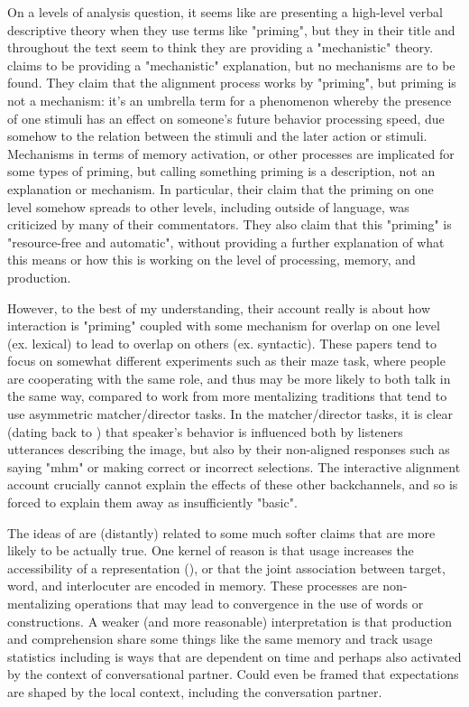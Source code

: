 \documentclass[]{article}
\begin{document}
On a levels of analysis question, it seems like \cite{pickering2004} are presenting a high-level verbal descriptive theory when they use terms like "priming", but they in their title and throughout the text seem to think they are providing a "mechanistic" theory. \cite{pickering2004} claims to be providing a "mechanistic" explanation, but no mechanisms are to be found. They claim that the alignment process works by "priming", but priming is not a mechanism: it's an umbrella term for a phenomenon whereby the presence of one stimuli has an effect on someone's future behavior processing speed, due somehow to the relation between the stimuli and the later action or stimuli. Mechanisms in terms of memory activation, or other processes are implicated for some types of priming, but calling something priming is a description, not an explanation or mechanism. In particular, their claim that the priming on one level somehow spreads to other levels, including outside of language, was criticized by many of their commentators. They also claim that this "priming" is "resource-free and automatic", without providing a further explanation of what this means or how this is working on the level of processing, memory, and production. 

However, to the best of my understanding, their account really is about how interaction is "priming" coupled with some mechanism for overlap on one level (ex. lexical) to lead to overlap on others (ex. syntactic). These papers tend to focus on somewhat different experiments such as their maze task, where people are cooperating with the same role, and thus may be more likely to both talk in the same way, compared to work from more mentalizing traditions that tend to use asymmetric matcher/director tasks. In the matcher/director tasks, it is clear (dating back to \cite{krauss1966}) that speaker's behavior is influenced both by listeners utterances describing the image, but also by their non-aligned responses such as saying "mhm" or making correct or incorrect selections. The interactive alignment account crucially cannot explain the effects of these other backchannels, and so is forced to explain them away as insufficiently "basic". 


The ideas of \cite{pickering2004} are (distantly) related to some much softer claims that are more likely to be actually true. One kernel of reason is that usage increases the accessibility of a representation (\cite{macdonald1994}), or that the joint association between target, word, and interlocuter are encoded in memory. These processes are non-mentalizing operations that may lead to convergence in the use of words or constructions. A weaker (and more reasonable) interpretation is that production and comprehension share some things like the same memory and track usage statistics including is ways that are dependent on time and perhaps also activated by the context of conversational partner.  Could even be framed that expectations are shaped by the local context, including the conversation partner. 
\end{document}
